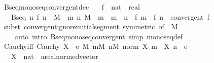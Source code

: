 \begin{isabellebody}
\endisatagproof
{\isafoldproof}%
%
\isadelimproof
\isanewline
%
\endisadelimproof
\isanewline
{}\isamarkupfalse%
\ Bseq{\isacharunderscore}{\kern0pt}monoseq{\isacharunderscore}{\kern0pt}convergent{\isacharprime}{\kern0pt}{\isacharunderscore}{\kern0pt}dec{\isacharcolon}{\kern0pt}\isanewline
\ \ \ f\ {\isacharcolon}{\kern0pt}{\isacharcolon}{\kern0pt}\ {\isachardoublequoteopen}nat\ {\isasymRightarrow}\ real{\isachardoublequoteclose}\isanewline
\ \ \ {\isachardoublequoteopen}Bseq\ {\isacharparenleft}{\kern0pt}{\isasymlambda}n{\isachardot}{\kern0pt}\ f\ {\isacharparenleft}{\kern0pt}n\ {\isacharplus}{\kern0pt}\ M{\isacharparenright}{\kern0pt}{\isacharparenright}{\kern0pt}\ {\isasymLongrightarrow}\ {\isacharparenleft}{\kern0pt}{\isasymAnd}m\ n{\isachardot}{\kern0pt}\ M\ {\isasymle}\ m\ {\isasymLongrightarrow}\ m\ {\isasymle}\ n\ {\isasymLongrightarrow}\ f\ m\ {\isasymge}\ f\ n{\isacharparenright}{\kern0pt}\ {\isasymLongrightarrow}\ convergent\ f{\isachardoublequoteclose}\isanewline
%
\isadelimproof
\ \ %
\endisadelimproof
%
\isatagproof
{}\isamarkupfalse%
\ {\isacharparenleft}{\kern0pt}subst\ convergent{\isacharunderscore}{\kern0pt}ignore{\isacharunderscore}{\kern0pt}initial{\isacharunderscore}{\kern0pt}segment\ {\isacharbrackleft}{\kern0pt}symmetric{\isacharcomma}{\kern0pt}\ of\ {\isacharunderscore}{\kern0pt}\ M{\isacharbrackright}{\kern0pt}{\isacharparenright}{\kern0pt}\isanewline
\ \ \ \ {\isacharparenleft}{\kern0pt}auto\ intro{\isacharbang}{\kern0pt}{\isacharcolon}{\kern0pt}\ Bseq{\isacharunderscore}{\kern0pt}monoseq{\isacharunderscore}{\kern0pt}convergent\ simp{\isacharcolon}{\kern0pt}\ monoseq{\isacharunderscore}{\kern0pt}def{\isacharparenright}{\kern0pt}%
\endisatagproof
{\isafoldproof}%
%
\isadelimproof
\isanewline
%
\endisadelimproof
\isanewline
{}\isamarkupfalse%
\ Cauchy{\isacharunderscore}{\kern0pt}iff{\isacharcolon}{\kern0pt}\ {\isachardoublequoteopen}Cauchy\ X\ {\isasymlongleftrightarrow}\ {\isacharparenleft}{\kern0pt}{\isasymforall}e{\isachargreater}{\kern0pt}{}{\isachardot}{\kern0pt}\ {\isasymexists}M{\isachardot}{\kern0pt}\ {\isasymforall}m{\isasymge}M{\isachardot}{\kern0pt}\ {\isasymforall}n{\isasymge}M{\isachardot}{\kern0pt}\ norm\ {\isacharparenleft}{\kern0pt}X\ m\ {\isacharminus}{\kern0pt}\ X\ n{\isacharparenright}{\kern0pt}\ {\isacharless}{\kern0pt}\ e{\isacharparenright}{\kern0pt}{\isachardoublequoteclose}\isanewline
\ \ \ X\ {\isacharcolon}{\kern0pt}{\isacharcolon}{\kern0pt}\ {\isachardoublequoteopen}nat\ {\isasymRightarrow}\ {\isacharprime}{\kern0pt}a{\isacharcolon}{\kern0pt}{\isacharcolon}{\kern0pt}real{\isacharunderscore}{\kern0pt}normed{\isacharunderscore}{\kern0pt}vector{\isachardoublequoteclose}\isanewline

\end{isabellebody}
